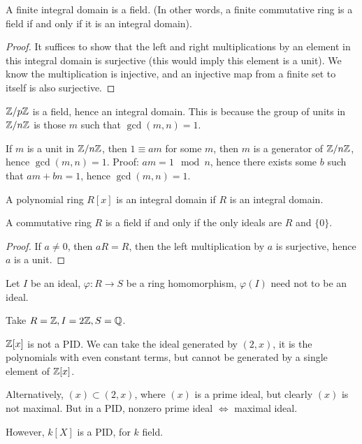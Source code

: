 \begin{prop}
    A finite integral domain is a field. (In other words, a finite commutative ring is a field if and only if it is an integral domain).
\end{prop}
\begin{proof}
    It suffices to show that the left and right multiplications by an element in this integral domain is surjective (this would imply this element is a unit). We know the multiplication is injective, and an injective map from a finite set to itself is also surjective.
\end{proof}
\begin{example}
    $\mathbb{Z}/p\mathbb{Z}$ is a field, hence an integral domain. This is because the group of units in $\mathbb{Z}/n\mathbb{Z}$ is those $m$ such that $\gcd(m,n)=1$. 

    If $m$ is a unit in $\mathbb{Z}/n\mathbb{Z}$, then $1\equiv am$ for some $m$, then $m$ is a generator of $\mathbb{Z}/n\mathbb{Z}$, hence $\gcd(m,n)=1$. Proof: $am=1 \mod n$, hence there exists some $b$ such that $am+bn=1$, hence $\gcd(m,n)=1$.
\end{example}
\begin{prop}
    A polynomial ring $R[x]$ is an integral domain if $R$ is an integral domain.
\end{prop}

\begin{example}
    A commutative ring $R$ is a field if and only if the only ideals are $R$ and $\{0\}$.
    \begin{proof}
        If $a\neq 0$, then $aR=R$, then the left multiplication by $a$ is surjective, hence $a$ is a unit.
    \end{proof}
\end{example}

\begin{example}
    Let $I$ be an ideal, $\varphi:R\to S$ be a ring homomorphism, $\varphi(I)$ need not to be an ideal.

    Take $R=\mathbb{Z}, I=2\mathbb{Z}, S=\mathbb{Q}$.
\end{example}
\begin{example}
    $\mathbb{Z}[x]$ is not a PID. We can take the ideal generated by $(2,x)$, it is the polynomials with even constant terms, but cannot be generated by a single element of $\mathbb{Z}[x]$.

    Alternatively, $(x)\subset (2,x)$, where $(x)$ is a prime ideal, but clearly $(x)$ is not maximal. But in a PID, nonzero prime ideal $\iff$ maximal ideal.

    However, $k[X]$ is a PID, for $k$ field.
\end{example}

